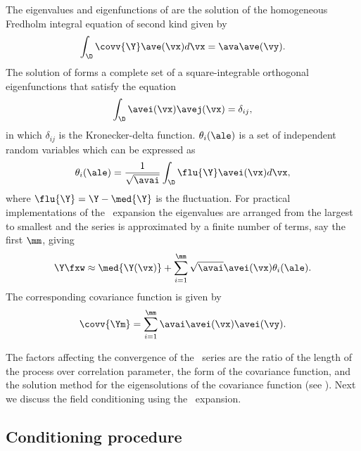 The eigenvalues and eigenfunctions of  are the solution of the homogeneous Fredholm integral equation of second kind given by
%
\begin{equation}
  \int_{\D} \covv{\Y} \ave(\vx) d\vx = \ava\ave(\vy).
\label{fred}
\end{equation}
%
\noindent The solution of  forms a complete set of a square-integrable
orthogonal eigenfunctions that satisfy the equation
%
\begin{equation*}
  \int_{\D} \avei(\vx) \avej(\vx)=\delta_{ij},
\label{ortho}
\end{equation*}
%
\noindent in which $\delta_{ij}$ is the Kronecker-delta function.
$\theta_{i}(\ale)$ is a set of independent random variables which
can be expressed as
%
\begin{equation*}
  \theta_{i}(\ale) = \displaystyle
\frac{1}{\sqrt{\avai}}\int_{\D}\flu{\Y}\avei(\vx) d\vx,
\end{equation*}
%
\noindent where $\flu{\Y}=\Y-\med{\Y}$ is the fluctuation.
For practical implementations of the \kl\ expansion the eigenvalues are arranged from the largest to smallest and the series is approximated by a finite number of terms, say the first $\mm$, giving
%
\begin{equation}
  \Y\fxw \approx \med{\Y(\vx)} +\sum_{i=1}^{\mm}\sqrt{\avai} \avei(\vx)
\theta_{i}(\ale).
\label{klM}
\end{equation}
%
The corresponding covariance function is given by 
%
\begin{equation*}
  \covv{\Ym} = \sum_{i=1}^{\mm} \avai\avei(\vx)\avei(\vy).
\label{klcovM}
\end{equation*}
%

The factors affecting the convergence of the \KL\ series are the ratio of the length of the process over correlation parameter, the form of the covariance function, and the solution method for the eigensolutions of the covariance function (see \cite{huang01}). 
Next we discuss the field conditioning using the \kl\ expansion.

\subsection{Conditioning procedure}\label{sec:klcond}

